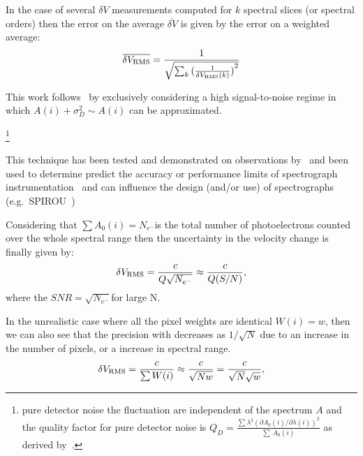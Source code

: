 In the case of several \(\delta V\) measurements computed for \(k\) spectral slices (or spectral orders) then the error on the average \(\overline{\delta V}\) is given by the error on a weighted average:
\begin{equation}
\overline{\delta {V}_{\textrm{RMS}}} = \frac{1}{\sqrt{\sum_k{{(\frac{1}{\delta V_{\textrm{RMS}}(k)})}^{2}}}}
\end{equation}

This work follows~\cite{figueira_radial_2016} by exclusively considering a high signal-to-noise regime in which \(A(i) + \sigma_{D}^{2} \sim A(i)\) can be approximated.


\footnote{pure detector noise the fluctuation are independent of the spectrum \(A\) and the quality factor for pure detector noise is \(Q_D = \frac{\sum{{\lambda}^{2} {(\partial A_0(i)/\partial \lambda(i))}^{2}}}{\sum{\, A_0(i)}}\) as derived by~\cite{connes_absolute_1985}. }


This technique has been tested and demonstrated on observations by~\citet{connes_demonstration_1996} and been used to determine predict the accuracy or performance limits of spectrograph instrumentation~\citep[e.g.][]{connes_absolute_1985,bouchy_fundamental_2001} and can influence the design (and/or use) of spectrographs
 (e.g.\ SPIROU~\citep{artigau_spirou_2014,figueira_radial_2016})


Considering that \(\sum{A_0(i)} = N_{{e}^{-}}\)is the total number of photoelectrons counted over the whole spectral range then the uncertainty in the velocity change is finally given by:
\begin{equation}
\delta V_{\textrm{RMS}} = \frac{c}{Q \sqrt{N_{{e}^{-}}}} \approx \frac{c}{Q (S/N)}, \label{eq:rv_SNR}
\end{equation}
where the \({SNR}=\sqrt{N_{{e}^{-}}}\)for large N. 


In the unrealistic case where all the pixel weights are identical $W(i)=w$, then we can also see that the precision with decreases as $1/\sqrt{N}$ due to an increase in the number of pixels, or a increase in spectral range.
 \begin{equation}
 \delta V_{\textrm{RMS}} = \frac{c}{\sum{W(i)}} \approx \frac{c}{\sqrt{N w}}=  \frac{c}{\sqrt{N}\sqrt{w}}, \label{eq:sqrtN}
 \end{equation}

